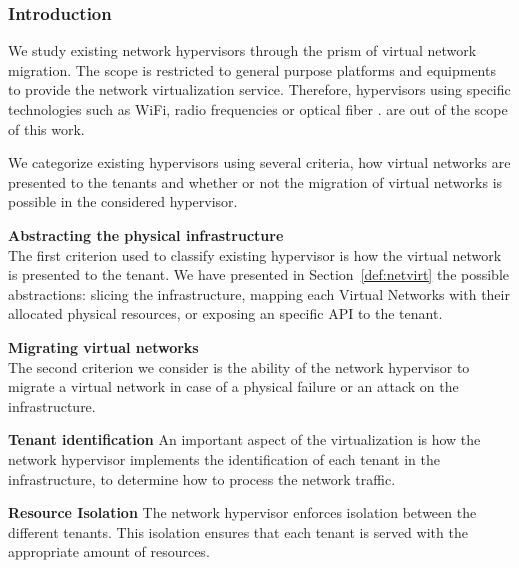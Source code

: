 \subsubsection{Introduction}
We study existing network hypervisors through the prism of virtual network migration.
The scope is restricted to general purpose platforms and equipments to provide the network virtualization service. Therefore, hypervisors using specific technologies such as WiFi, radio frequencies or optical fiber \etc. are out of the scope of this work.

We categorize existing hypervisors using several criteria, how virtual networks are presented to the tenants and whether or not the migration of virtual networks is possible in the considered hypervisor.

\textbf{Abstracting the physical infrastructure\\}
The first criterion used to classify existing hypervisor is how the virtual network is presented to the tenant. We have presented in Section~\ref{def:netvirt} the possible abstractions: slicing the infrastructure, mapping each Virtual Networks with their allocated physical resources, or exposing an specific API to the tenant.

\textbf{Migrating virtual networks\\}
The second criterion we consider is the ability of the network hypervisor to migrate a virtual network in case of a physical failure or an attack on the infrastructure.

\textbf{Tenant identification}
An important aspect of the virtualization is how the network hypervisor implements the identification of each tenant in the infrastructure, to determine how to process the network traffic.

\textbf{Resource Isolation}
The network hypervisor enforces isolation between the different tenants.
This isolation ensures that each tenant is served with the appropriate amount of resources.

